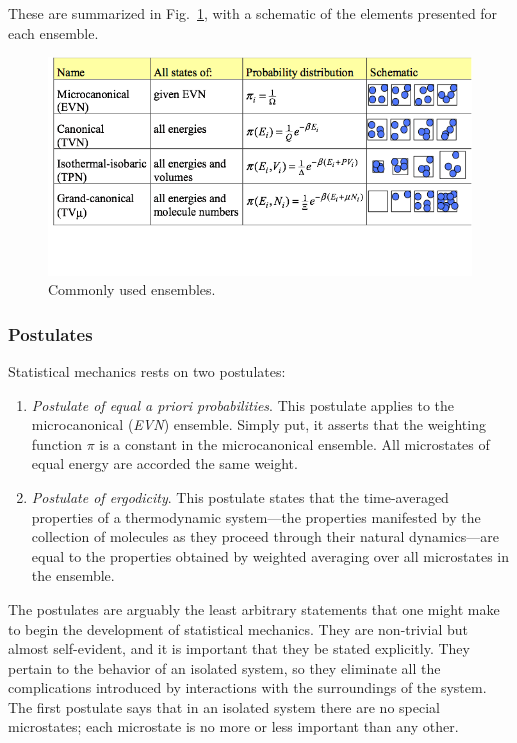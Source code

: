 \documentclass[]{article}
\begin{document}
These are summarized in Fig.~\ref{fig:ensembles}, with a schematic of the elements
presented for each ensemble.

\begin{figure}
\includegraphics[width=\textwidth]{image003}
\caption{\label{fig:ensembles}Commonly used ensembles.}
\end{figure}


\subsubsection{Postulates}\label{postulates}

Statistical mechanics rests on two postulates:

\begin{enumerate}
\def\labelenumi{\arabic{enumi}.}
\item
  \emph{Postulate of equal \emph{a priori} probabilities}. This
  postulate applies to the microcanonical (\emph{EVN}) ensemble. Simply put, it
  asserts that the weighting function $\pi$ is a constant in the
  microcanonical ensemble. All microstates of equal energy are accorded
  the same weight.
\item
  \emph{Postulate of ergodicity}. This postulate states that the
  time-averaged properties of a thermodynamic system---the properties
  manifested by the collection of molecules as they proceed through
  their natural dynamics---are equal to the properties obtained by
  weighted averaging over all microstates in the ensemble.
\end{enumerate}

The postulates are arguably the least arbitrary statements that one
might make to begin the development of statistical mechanics. They are
non-trivial but almost self-evident, and it is important that they be
stated explicitly. They pertain to the behavior of an isolated system,
so they eliminate all the complications introduced by interactions with
the surroundings of the system. The first postulate says that in an
isolated system there are no special microstates; each microstate is no
more or less important than any other.
\end{document}
